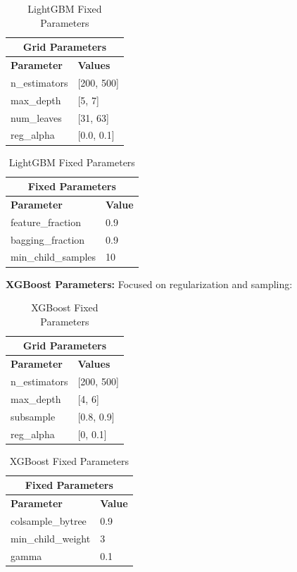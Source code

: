 \documentclass[12pt]{article}
\begin{document}
\begin{table}[H]
\centering
\footnotesize
\begin{minipage}{0.48\textwidth}
\centering
\begin{tabular}{|l|l|}
\hline
\multicolumn{2}{|c|}{\textbf{Grid Parameters}} \\
\hline
\textbf{Parameter} & \textbf{Values} \\
\hline
n\_estimators & [200, 500] \\
max\_depth & [5, 7] \\
num\_leaves & [31, 63] \\
reg\_alpha & [0.0, 0.1] \\
\hline
\end{tabular}
\caption{LightGBM Grid Parameters}
\end{minipage}
\hfill
\begin{minipage}{0.48\textwidth}
\centering
\begin{tabular}{|l|l|}
\hline
\multicolumn{2}{|c|}{\textbf{Fixed Parameters}} \\
\hline
\textbf{Parameter} & \textbf{Value} \\
\hline
feature\_fraction & 0.9 \\
bagging\_fraction & 0.9 \\
min\_child\_samples & 10 \\
\hline
\end{tabular}
\caption{LightGBM Fixed Parameters}
\end{minipage}
\end{table}
\vspace{0.5cm}
\textbf{XGBoost Parameters:} Focused on regularization and sampling:
\begin{table}[H]
\centering
\footnotesize
\begin{minipage}{0.48\textwidth}
\centering
\begin{tabular}{|l|l|}
\hline
\multicolumn{2}{|c|}{\textbf{Grid Parameters}} \\
\hline
\textbf{Parameter} & \textbf{Values} \\
\hline
n\_estimators & [200, 500] \\
max\_depth & [4, 6] \\
subsample & [0.8, 0.9] \\
reg\_alpha & [0, 0.1] \\
\hline
\end{tabular}
\caption{XGBoost Grid Parameters}
\end{minipage}
\hfill
\begin{minipage}{0.48\textwidth}
\centering
\begin{tabular}{|l|l|}
\hline
\multicolumn{2}{|c|}{\textbf{Fixed Parameters}} \\
\hline
\textbf{Parameter} & \textbf{Value} \\
\hline
colsample\_bytree & 0.9 \\
min\_child\_weight & 3 \\
gamma & 0.1 \\
\hline
\end{tabular}
\caption{XGBoost Fixed Parameters}
\end{minipage}
\end{table}
\end{document}

